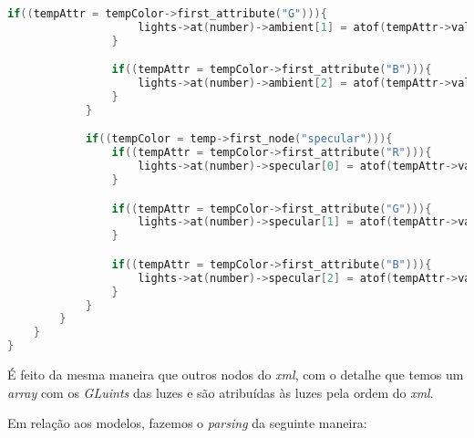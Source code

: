 \documentclass[14pt, a4 paper]{report}
\begin{document}
\begin{lstlisting}[language = c++]
                if((tempAttr = tempColor->first_attribute("G"))){
                    lights->at(number)->ambient[1] = atof(tempAttr->value())/255;
                }

                if((tempAttr = tempColor->first_attribute("B"))){
                    lights->at(number)->ambient[2] = atof(tempAttr->value())/255;
                }
            }

            if((tempColor = temp->first_node("specular"))){
                if((tempAttr = tempColor->first_attribute("R"))){
                    lights->at(number)->specular[0] = atof(tempAttr->value())/255;
                }

                if((tempAttr = tempColor->first_attribute("G"))){
                    lights->at(number)->specular[1] = atof(tempAttr->value())/255;
                } 

                if((tempAttr = tempColor->first_attribute("B"))){
                    lights->at(number)->specular[2] = atof(tempAttr->value())/255;
                }
            }
        }
    }
}
\end{lstlisting}

É feito da mesma maneira que outros nodos do \textit{xml}, com o detalhe que temos um \textit{array} com os \textit{GLuints} das luzes e são atribuídas às luzes pela ordem do \textit{xml}.

Em relação aos modelos, fazemos o \textit{parsing} da seguinte maneira:
\end{document}

